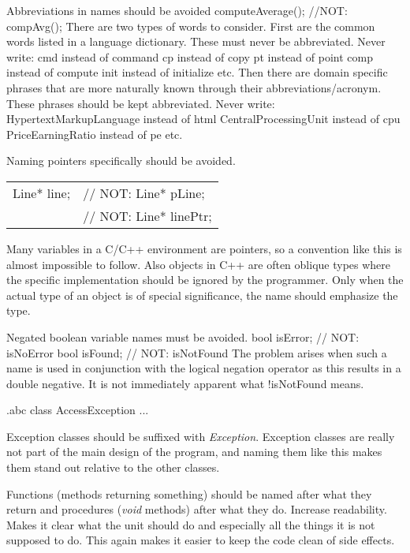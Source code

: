 \recommendation
{Abbreviations in names should be avoided}
{computeAverage(); //NOT: compAvg();}
{
	There are two types of words to consider. First are the common words listed in a language dictionary. These must never be abbreviated. Never write:\newline
	cmd   instead of   command\newline
	cp    instead of   copy\newline
	pt    instead of   point\newline
	comp  instead of   compute\newline
	init  instead of   initialize\newline
	etc.\newline
	Then there are domain specific phrases that are more naturally known through their abbreviations/acronym. These phrases should be kept abbreviated. Never write:\newline
	HypertextMarkupLanguage  instead of   html\newline
	CentralProcessingUnit    instead of   cpu\newline
	PriceEarningRatio        instead of   pe\newline
	etc.
}

\recommendation
{Naming pointers specifically should be avoided.}
{
	\begin{tabularx}{\textwidth}{ll}
		Line* line;&// NOT: Line* pLine;\\
		&// NOT: Line* linePtr;
	\end{tabularx}
}
{Many variables in a C/C++ environment are pointers, so a convention like this is almost impossible to follow. Also objects in C++ are often oblique types where the specific implementation should be ignored by the programmer. Only when the actual type of an object is of special significance, the name should emphasize the type.}

\recommendation
{Negated boolean variable names must be avoided.}
{
	bool isError; // NOT: isNoError\newline
	bool isFound; // NOT: isNotFound
}
{The problem arises when such a name is used in conjunction with the logical negation operator as this results in a double negative. It is not immediately apparent what !isNotFound means.}

\begin{filecontents*}{\jobname.abc}
	class AccessException
	{
		...
	}
\end{filecontents*}

\recommendation
{Exception classes should be suffixed with \textit{Exception}.}
{}
{Exception classes are really not part of the main design of the program, and naming them like this makes them stand out relative to the other classes.}

\recommendation
{Functions (methods returning something) should be named after what they return and procedures (\textit{void} methods) after what they do.}
{}
{Increase readability. Makes it clear what the unit should do and especially all the things it is not supposed to do. This again makes it easier to keep the code clean of side effects.}